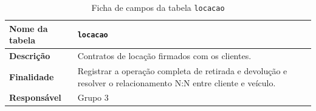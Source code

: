 \begin{table}[!t]
\caption{Ficha de campos da tabela \texttt{locacao}}
\label{tab:f_locacao}
\centering
\scriptsize
\setlength{\tabcolsep}{2pt}
\begin{tabular}{|L{3.2cm}|L{14.2cm}|}
\hline
\textbf{Nome da tabela} & \texttt{locacao} \\
\hline
\textbf{Descri\c{c}\~ao} & Contratos de loca\c{c}\~ao firmados com os clientes. \\
\hline
\textbf{Finalidade} & Registrar a opera\c{c}\~ao completa de retirada e devolu\c{c}\~ao e resolver o relacionamento N:N entre cliente e ve\'iculo. \\
\hline
\textbf{Respons\'avel} & Grupo 3 \\
\hline
\end{tabular}

\vspace{3pt}


\end{table}
